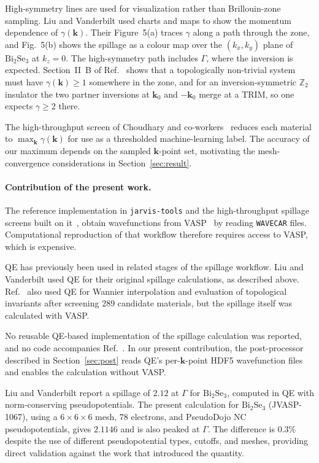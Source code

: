 \documentclass[11pt]{article}
\newcommand{\kk}{\mathbf{k}}
\begin{document}
High-symmetry lines are used for visualization rather than Brillouin-zone sampling. Liu and
Vanderbilt used charts and maps to show the momentum dependence of $\gamma(\kk)$. Their Figure~5(a)
traces $\gamma$ along a path through the zone, and Fig.~5(b) shows the spillage as a colour map over
the $(k_x,k_y)$ plane of $\mathrm{Bi_2Se_3}$ at $k_z=0$. The high-symmetry path includes $\Gamma$,
where the inversion is
expected. Section~II~B of Ref.~\cite{liu2014} shows that a topologically non-trivial
system must have $\gamma(\kk)\ge 1$ somewhere in the zone, and for an inversion-symmetric
$\mathbb{Z}_2$ insulator the two partner inversions at $\kk_0$ and $-\kk_0$ merge at a TRIM, so one
expects $\gamma \ge 2$ there.

The high-throughput
screen of Choudhary and co-workers~\cite{choudhary2019,choudhary2021} reduces each material to
$\max_\kk \gamma(\kk)$ for use as a thresholded machine-learning label. The accuracy of our maximum
depends on the sampled $\kk$-point set, motivating the mesh-convergence considerations in
Section~\ref{sec:result}.

\paragraph{Contribution of the present work.} The reference implementation in \texttt{jarvis-tools} and the
high-throughput spillage screens built on it~\cite{choudhary2019,choudhary2020npj,choudhary2021},
obtain wavefunctions from VASP~\cite{kresse1996} by reading \texttt{WAVECAR} files. Computational
reproduction of that workflow therefore requires access to VASP, which is expensive.

QE has previously been used in related stages of the spillage workflow. Liu and Vanderbilt used QE
for their original spillage calculations, as described above. Ref.~\cite{choudhary2019} also used QE
for Wannier interpolation and evaluation of topological invariants after screening 289 candidate
materials, but the spillage itself was calculated with VASP.

No reusable QE-based implementation of the spillage calculation was reported, and no code
accompanies Ref.~\cite{liu2014}. In our present contribution, the post-processor described in
Section~\ref{sec:post} reads QE's per-$\kk$-point HDF5 wavefunction files and enables the calculation
without VASP.

Liu and Vanderbilt report a spillage of $2.12$ at $\Gamma$ for $\mathrm{Bi_2Se_3}$, computed in QE with norm-conserving
pseudopotentials. The present calculation for $\mathrm{Bi_2Se_3}$ (JVASP-1067), using a
$6\times6\times6$ mesh, $78$ electrons, and PseudoDojo NC pseudopotentials, gives $2.1146$ and is also
peaked at $\Gamma$. The difference is $0.3\%$ despite the use of different pseudopotential types,
cutoffs, and meshes, providing direct validation against the work that introduced the quantity.
\end{document}
